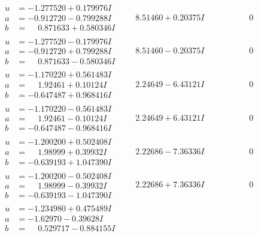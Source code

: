 \documentclass[1p]{elsarticle_modified}
\theoremstyle{definition}
\begin{document}
$$\begin{array}{c|c|c}
\begin{aligned}
u &= -1.277520 + 0.179976 I \\
a &= -0.912720 - 0.799288 I \\
b &= \phantom{-}0.871633 + 0.580346 I\end{aligned}
 & \phantom{-}8.51460 + 0.20375 I & \phantom{-0.000000 } 0 \\ \hline\begin{aligned}
u &= -1.277520 - 0.179976 I \\
a &= -0.912720 + 0.799288 I \\
b &= \phantom{-}0.871633 - 0.580346 I\end{aligned}
 & \phantom{-}8.51460 - 0.20375 I & \phantom{-0.000000 } 0 \\ \hline\begin{aligned}
u &= -1.170220 + 0.561483 I \\
a &= \phantom{-}1.92461 + 0.10124 I \\
b &= -0.647487 + 0.968416 I\end{aligned}
 & \phantom{-}2.24649 - 6.43121 I & \phantom{-0.000000 } 0 \\ \hline\begin{aligned}
u &= -1.170220 - 0.561483 I \\
a &= \phantom{-}1.92461 - 0.10124 I \\
b &= -0.647487 - 0.968416 I\end{aligned}
 & \phantom{-}2.24649 + 6.43121 I & \phantom{-0.000000 } 0 \\ \hline\begin{aligned}
u &= -1.200200 + 0.502408 I \\
a &= \phantom{-}1.98999 + 0.39932 I \\
b &= -0.639193 + 1.047390 I\end{aligned}
 & \phantom{-}2.22686 - 7.36336 I & \phantom{-0.000000 } 0 \\ \hline\begin{aligned}
u &= -1.200200 - 0.502408 I \\
a &= \phantom{-}1.98999 - 0.39932 I \\
b &= -0.639193 - 1.047390 I\end{aligned}
 & \phantom{-}2.22686 + 7.36336 I & \phantom{-0.000000 } 0 \\ \hline\begin{aligned}
u &= -1.234980 + 0.475489 I \\
a &= -1.62970 - 0.39628 I \\
b &= \phantom{-}0.529717 - 0.884155 I\end{aligned}

\end{array}$$
\end{document}
